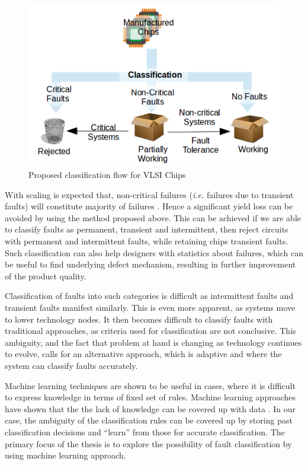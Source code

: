 \begin{figure}[h]
  \begin{center}
    \captionsetup{justification=centering}
    \includegraphics[scale=0.55]{figures/proposedflow.png}
    \caption{Proposed classification flow for VLSI Chips}
    \label{fig:proposedflow}
  \end{center}
\end{figure}

With scaling is expected that, non-critical failures (\emph{i.e.} failures due to transient faults) will constitute majority of failures \cite{Constantinescu2003}. Hence a significant yield loss can be avoided by using the method proposed above. This can be achieved if we are able to classify faults as permanent, transient and intermittent, then reject circuits with permanent and intermittent faults, while retaining chips transient faults. Such classification can also help designers with statistics about failures, which can be useful to find underlying defect mechanism, resulting in further improvement of the product quality.

Classification of faults into such categories is difficult as intermittent faults and transient faults manifest similarly. This is even more apparent, as systems move to lower technology nodes. It then becomes difficult to classify faults with traditional approaches, as criteria used for classification are not conclusive. This ambiguity, and the fact that problem at hand is changing as technology continues to evolve, calls for an alternative approach, which is adaptive and where the system can classify faults accurately.

Machine learning techniques are shown to be useful in cases, where it is difficult to express knowledge in terms of fixed set of rules. Machine learning approaches have shown that the the lack of knowledge can be covered up with data \cite{Alpaydin2004}. In our case, the ambiguity of the classification rules can be covered up by storing past classification decisions and \enquote{learn} from those for accurate classification. The primary focus of the thesis is to explore the possibility of fault classification by using machine learning approach.


